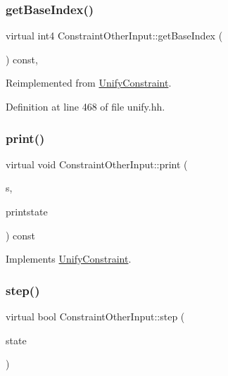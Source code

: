 \subsubsection{\texorpdfstring{getBaseIndex()}{getBaseIndex()}}
{\footnotesize\ttfamily virtual int4 Constraint\+Other\+Input\+::get\+Base\+Index (\begin{DoxyParamCaption}\item[{void}]{ }\end{DoxyParamCaption}) const\hspace{0.3cm}{\ttfamily [inline]}, {\ttfamily [virtual]}}



Reimplemented from \mbox{\hyperlink{class_unify_constraint_a44f0164f38ac1fdc44fc73ebe7678de1}{Unify\+Constraint}}.



Definition at line 468 of file unify.\+hh.

\mbox{\label{class_constraint_other_input_abe192ddbd5969e1f9abadb6ab2a1a8bf}} 
\subsubsection{\texorpdfstring{print()}{print()}}
{\footnotesize\ttfamily virtual void Constraint\+Other\+Input\+::print (\begin{DoxyParamCaption}\item[{ostream \&}]{s,  }\item[{\mbox{\hyperlink{class_unify_c_printer}{Unify\+C\+Printer}} \&}]{printstate }\end{DoxyParamCaption}) const\hspace{0.3cm}{\ttfamily [virtual]}}



Implements \mbox{\hyperlink{class_unify_constraint_a774f6a611a96384766cb8e8d8f5ff41f}{Unify\+Constraint}}.

\mbox{\label{class_constraint_other_input_af89c902f186ba083e4fd4b54efcc551a}} 
\subsubsection{\texorpdfstring{step()}{step()}}
{\footnotesize\ttfamily virtual bool Constraint\+Other\+Input\+::step (\begin{DoxyParamCaption}\item[{\mbox{\hyperlink{class_unify_state}{Unify\+State}} \&}]{state }\end{DoxyParamCaption})\hspace{0.3cm}{\ttfamily [virtual]}}




